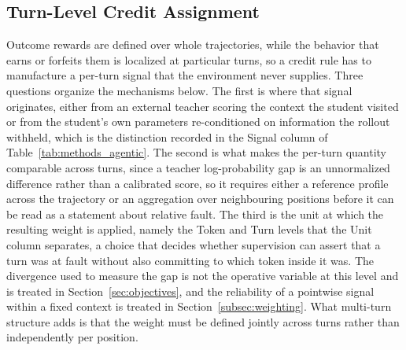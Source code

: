 \documentclass{article} %
\begin{document}
\subsection{Turn-Level Credit Assignment}
\label{subsec:agentic_credit}

Outcome rewards are defined over whole trajectories, while the behavior that earns or forfeits them is localized at particular turns, so a credit rule has to manufacture a per-turn signal that the environment never supplies. Three questions organize the mechanisms below. The first is where that signal originates, either from an external teacher scoring the context the student visited or from the student's own parameters re-conditioned on information the rollout withheld, which is the distinction recorded in the Signal column of Table~\ref{tab:methods_agentic}. The second is what makes the per-turn quantity comparable across turns, since a teacher log-probability gap is an unnormalized difference rather than a calibrated score, so it requires either a reference profile across the trajectory or an aggregation over neighbouring positions before it can be read as a statement about relative fault. The third is the unit at which the resulting weight is applied, namely the Token and Turn levels that the Unit column separates, a choice that decides whether supervision can assert that a turn was at fault without also committing to which token inside it was. The divergence used to measure the gap is not the operative variable at this level and is treated in Section~\ref{sec:objectives}, and the reliability of a pointwise signal within a fixed context is treated in Section~\ref{subsec:weighting}. What multi-turn structure adds is that the weight must be defined jointly across turns rather than independently per position.
\end{document}

